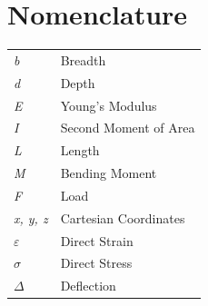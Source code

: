 \documentclass[12pt]{article}
\begin{document}



\section{Nomenclature}
\begin{tabular}{l l}
\emph{b} & Breadth \\
\emph{d} & Depth \\
\emph{E} & Young's Modulus \\
\emph{I} & Second Moment of Area \\
\emph{L} & Length \\
\emph{M} & Bending Moment \\
\emph{F} & Load \\
\emph{x, y, z} & Cartesian Coordinates \\
\emph{$\varepsilon$} & Direct Strain \\
\emph{$\sigma$} & Direct Stress \\
\emph{$\Delta$} & Deflection \\


\end{tabular}
\end{document}
